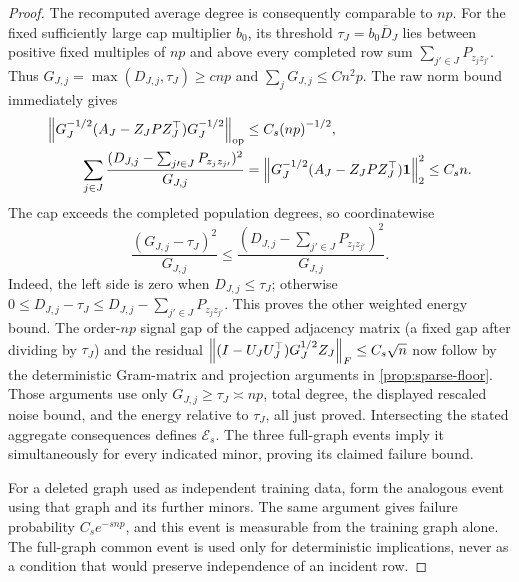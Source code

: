 \begin{proof}
The recomputed average degree is consequently comparable to ${np}$.
For the fixed sufficiently large cap multiplier $b_0$, its threshold
$\tau_J=b_0\overline D_J$ lies between positive fixed multiples of
${np}$ and above every completed row sum $\sum_{j\prime\in J}P_{z_j z_{j\prime}}$.
Thus $G_{J,j}=\max(D_{J,j},\tau_J)\ge c{np}$ and
$\sum_jG_{J,j}\le C{n^2p}$. The raw norm bound immediately gives
\begin{align*}
 \left\lVert G_J^{-1/2}(A_J-{Z_JPZ_J^\top})G_J^{-1/2}\right\rVert_{\mathrm{op}}
   &\le C_s{(np)}^{-1/2},\\
 \sum_{j\in J}\frac{(D_{J,j}-\sum_{j\prime\in J}P_{z_j z_{j\prime}})^2}{G_{J,j}}
   &=\left\lVert G_J^{-1/2}(A_J-{Z_JPZ_J^\top})\mathbf 1\right\rVert_2^2
     \le C_sn.
\end{align*}
The cap exceeds the completed population degrees, so coordinatewise
\[
 \frac{(G_{J,j}-\tau_J)^2}{G_{J,j}}
 \le\frac{(D_{J,j}-\sum_{j\prime\in J}P_{z_j z_{j\prime}})^2}{G_{J,j}}.
\]
Indeed, the left side is zero when $D_{J,j}\le\tau_J$; otherwise
$0\le D_{J,j}-\tau_J\le D_{J,j}-\sum_{j\prime\in J}P_{z_j z_{j\prime}}$. This proves the
other weighted energy bound. The order-${np}$ signal gap of the
capped adjacency matrix (a fixed gap after dividing by $\tau_J$)
and the residual
$\left\lVert(I-U_JU_J^\top)G_J^{1/2}Z_J\right\rVert_F\le C_s\sqrt n$
now follow by the deterministic Gram-matrix and projection arguments
in \cref{prop:sparse-floor}. Those arguments use only
$G_{J,j}\ge\tau_J\asymp {np}$, total degree, the displayed rescaled
noise bound, and the energy relative to $\tau_J$, all just proved.
Intersecting the stated aggregate consequences defines
$\mathcal E_s$. The three full-graph events imply it simultaneously
for every indicated minor, proving its claimed failure bound.

For a deleted graph used as independent training data, form the
analogous event using that graph and its further minors. The same
argument gives failure probability $C_se^{-s{np}}$, and this event is
measurable from the training graph alone. The full-graph common event
is used only for deterministic implications, never as a condition
that would preserve independence of an incident row.
\end{proof}

